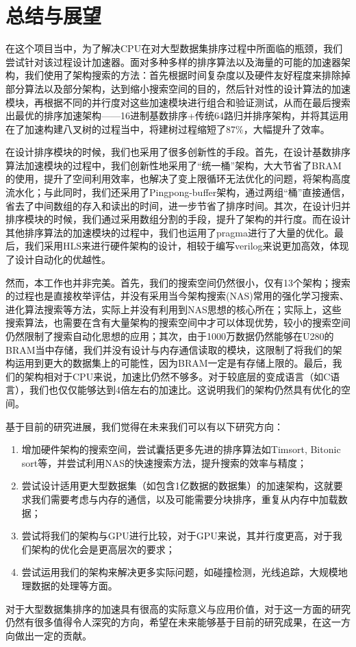 
\chapter{总结与展望}

在这个项目当中，为了解决CPU在对大型数据集排序过程中所面临的瓶颈，我们尝试针对该过程设计加速器。面对多种多样的排序算法以及海量的可能的加速器架构，我们使用了架构搜索的方法：首先根据时间复杂度以及硬件友好程度来排除掉部分算法以及部分架构，达到缩小搜索空间的目的，然后针对性的设计算法的加速模块，再根据不同的并行度对这些加速模块进行组合和验证测试，从而在最后搜索出最优的排序加速架构——16进制基数排序+传统64路归并排序架构，并将其运用在了加速构建八叉树的过程当中，将建树过程缩短了87\%，大幅提升了效率。

在设计排序模块的时候，我们也采用了很多创新性的手段。首先，在设计基数排序算法加速模块的过程中，我们创新性地采用了“统一桶”架构，大大节省了BRAM的使用，提升了空间利用效率，也解决了变上限循环无法优化的问题，将架构高度流水化；与此同时，我们还采用了Pingpong-buffer架构，通过两组“桶”直接通信，省去了中间数组的存入和读出的时间，进一步节省了排序时间。其次，在设计归并排序模块的时候，我们通过采用数组分割的手段，提升了架构的并行度。而在设计其他排序算法的加速模块的过程中，我们也运用了pragma进行了大量的优化。最后，我们采用HLS来进行硬件架构的设计，相较于编写verilog来说更加高效，体现了设计自动化的优越性。

然而，本工作也并非完美。首先，我们的搜索空间仍然很小，仅有13个架构；搜索的过程也是直接枚举评估，并没有采用当今架构搜索(NAS)常用的强化学习搜索、进化算法搜索等方法，实际上并没有利用到NAS思想的核心所在；实际上，这些搜索算法，也需要在含有大量架构的搜索空间中才可以体现优势，较小的搜索空间仍然限制了搜索自动化思想的应用；其次，由于1000万数据仍然能够在U280的BRAM当中存储，我们并没有设计与内存通信读取的模块，这限制了将我们的架构运用到更大的数据集上的可能性，因为BRAM一定是有存储上限的。最后，我们的架构相对于CPU来说，加速比仍然不够多。对于较底层的变成语言（如C语言），我们也仅仅能够达到4倍左右的加速比。这说明我们的架构仍然具有优化的空间。

基于目前的研究进展，我们觉得在未来我们可以有以下研究方向：
\begin{enumerate}
    \item 增加硬件架构的搜索空间，尝试囊括更多先进的排序算法如Timsort, Bitonic sort等，并尝试利用NAS的快速搜索方法，提升搜索的效率与精度；
    \item 尝试设计适用更大型数据集（如包含1亿数据的数据集）的加速架构，这就要求我们需要考虑与内存的通信，以及可能需要分块排序，重复从内存中加载数据；
    \item 尝试将我们的架构与GPU进行比较，对于GPU来说，其并行度更高，对于我们架构的优化会是更高层次的要求；
    \item 尝试运用我们的架构来解决更多实际问题，如碰撞检测，光线追踪，大规模地理数据的处理等方面。
\end{enumerate}

对于大型数据集排序的加速具有很高的实际意义与应用价值，对于这一方面的研究仍然有很多值得令人深究的方向，希望在未来能够基于目前的研究成果，在这一方向做出一定的贡献。